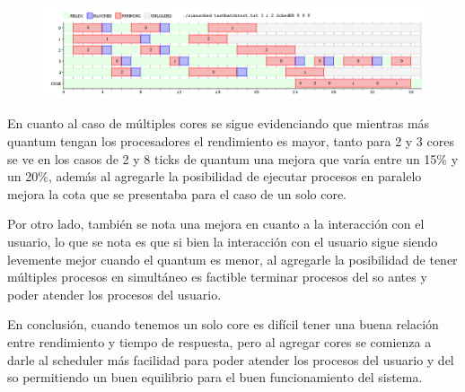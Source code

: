 \begin{figure}[H]
  \centering
\includegraphics[scale=0.45]{graficos/ejercicio7/3testTask1.png}
  \caption[Task Batch con un nucleo y  quantum 8]{}
\end{figure}

En cuanto al caso de múltiples cores se sigue evidenciando que mientras más quantum tengan los procesadores el rendimiento es mayor, tanto para 2 y 3 cores se ve en los casos de 2 y 8 ticks de quantum una mejora que varía entre un 15\% y un 20\%, además al agregarle la posibilidad de ejecutar procesos en paralelo mejora la cota que se presentaba para el caso de un solo core.

Por otro lado, también se nota una mejora en cuanto a la interacción con el usuario, lo que se nota es que si bien la interacción con el usuario sigue siendo levemente mejor cuando el quantum es menor, al agregarle la posibilidad de tener múltiples procesos en simultáneo es factible terminar procesos del so antes y poder atender los procesos del usuario.

En conclusión, cuando tenemos un solo core es difícil tener una buena relación entre rendimiento y tiempo de respuesta, pero al agregar cores se comienza a darle al scheduler más facilidad para poder atender los procesos del usuario y del so permitiendo un buen equilibrio para el buen funcionamiento del sistema.
